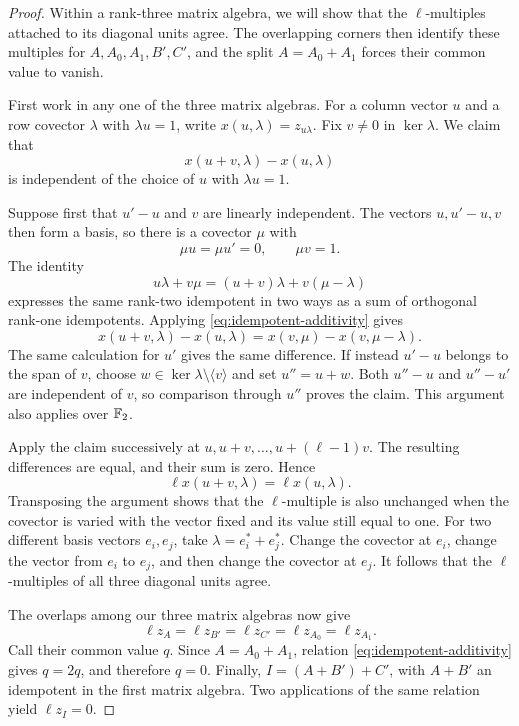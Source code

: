 \begin{proof}
Within a rank-three matrix algebra, we will show that the
$\ell$-multiples attached to its diagonal units agree.  The overlapping
corners then identify these multiples for $A,A_0,A_1,B',C'$,
and the split $A=A_0+A_1$ forces their common value to vanish.

First work in any one of the three matrix algebras.  For a column
vector $u$ and a row covector $\lambda$ with $\lambda u=1$, write
$x(u,\lambda)=z_{u\lambda}$.  Fix $v\ne0$ in $\ker\lambda$.
We claim that
\[
 x(u+v,\lambda)-x(u,\lambda)
\]
is independent of the choice of $u$ with $\lambda u=1$.

Suppose first that $u'-u$ and $v$ are linearly independent.  The vectors
$u,u'-u,v$ then form a basis, so there is a covector $\mu$ with
\[
 \mu u=\mu u'=0,\qquad \mu v=1.
\]
The identity
\[
 u\lambda+v\mu=(u+v)\lambda+v(\mu-\lambda)
\]
expresses the same rank-two idempotent in two ways as a sum of
orthogonal rank-one idempotents.  Applying
\eqref{eq:idempotent-additivity} gives
\begin{equation}\label{eq:rank-one-difference}
 x(u+v,\lambda)-x(u,\lambda)
   =x(v,\mu)-x(v,\mu-\lambda).
\end{equation}
The same calculation for $u'$ gives the same difference.  If instead
$u'-u$ belongs to the span of $v$, choose
$w\in\ker\lambda\setminus\langle v\rangle$ and set $u''=u+w$.
Both $u''-u$ and $u''-u'$ are independent of $v$, so comparison through
$u''$ proves the claim.  This argument also applies over $\mathbb F_2$.

Apply the claim successively at $u,u+v,\ldots,u+(\ell-1)v$.
The resulting differences are equal, and their sum is zero.  Hence
\[
 \ell x(u+v,\lambda)=\ell x(u,\lambda).
\]
Transposing the argument shows that the $\ell$-multiple is also
unchanged when the covector is varied with the vector fixed and its
value still equal to one.  For two different basis vectors $e_i,e_j$,
take $\lambda=e_i^*+e_j^*$.  Change the covector at $e_i$, change the
vector from $e_i$ to $e_j$, and then change the covector at $e_j$.
It follows that the $\ell$-multiples of all three diagonal units agree.

The overlaps among our three matrix algebras now give
\[
 \ell z_A=\ell z_{B'}=\ell z_{C'}
            =\ell z_{A_0}=\ell z_{A_1}.
\]
Call their common value $q$.  Since $A=A_0+A_1$, relation
\eqref{eq:idempotent-additivity} gives $q=2q$, and therefore $q=0$.
Finally, $I=(A+B')+C'$, with $A+B'$ an idempotent in the first matrix
algebra.  Two applications of the same relation yield
$\ell z_I=0$.
\end{proof}

